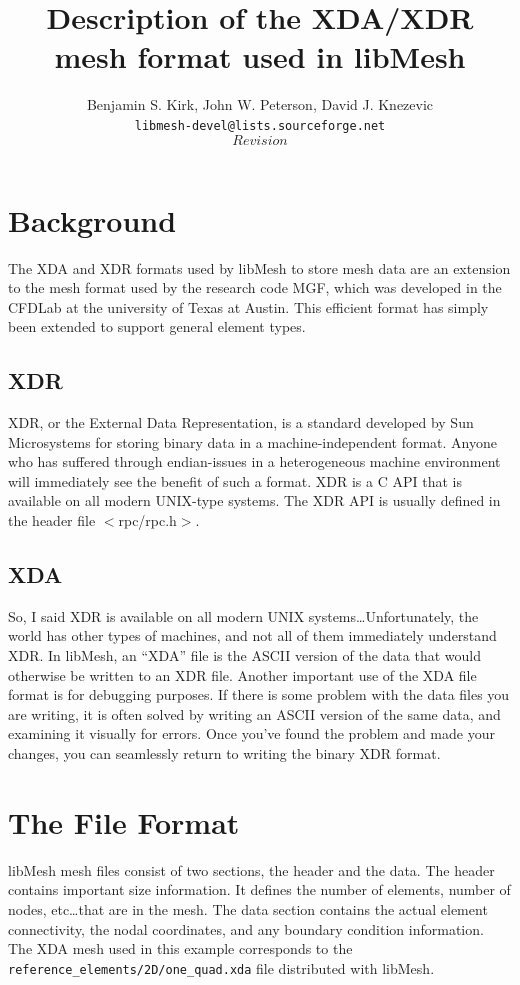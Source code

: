 \documentclass[12pt]{article}
\begin{document}
  
\title{Description of the XDA/XDR mesh format used in libMesh}
\author{Benjamin S. Kirk, John W. Peterson, David J. Knezevic \\
        \texttt{libmesh-devel@lists.sourceforge.net} \\
	$$Revision$$} 
\maketitle

\section{Background}
The XDA and XDR formats used by libMesh to store mesh data are an extension to the mesh format used by the research code MGF, which was developed in the CFDLab at the university of Texas at Austin.  This efficient format has simply been extended to support general element types.

\subsection{XDR}
XDR, or the External Data Representation, is a standard developed by Sun Microsystems for storing binary data in a machine-independent format.  Anyone who has suffered through endian-issues in a heterogeneous machine environment will immediately see the benefit of such a format.  XDR is a C API that is available on all modern UNIX-type systems.  The XDR API is usually defined in the header file $<$rpc/rpc.h$>$.

\subsection{XDA}
So, I said XDR is available on all modern UNIX systems\ldots Unfortunately, the world has other types of machines, and not all of them immediately understand XDR.  In libMesh, an ``XDA'' file is the ASCII version of the data that would otherwise be written to an XDR file.  Another important use of the XDA file format is for debugging purposes.  If there is some problem with the data files you are writing, it is often solved by writing an ASCII version of the same data, and examining it visually for errors.  Once you've found the problem and made your changes, you can seamlessly return to writing the binary XDR format.

\section{The File Format}
libMesh mesh files consist of two sections, the header and the data.  The header contains important size information.  It defines the number of elements, number of nodes, etc\ldots that are in the mesh.  The data section contains the actual element connectivity, the nodal coordinates, and any boundary condition information.  The XDA mesh used in this example corresponds to the \texttt{reference\_elements/2D/one\_quad.xda} file distributed with libMesh.
\end{document}
